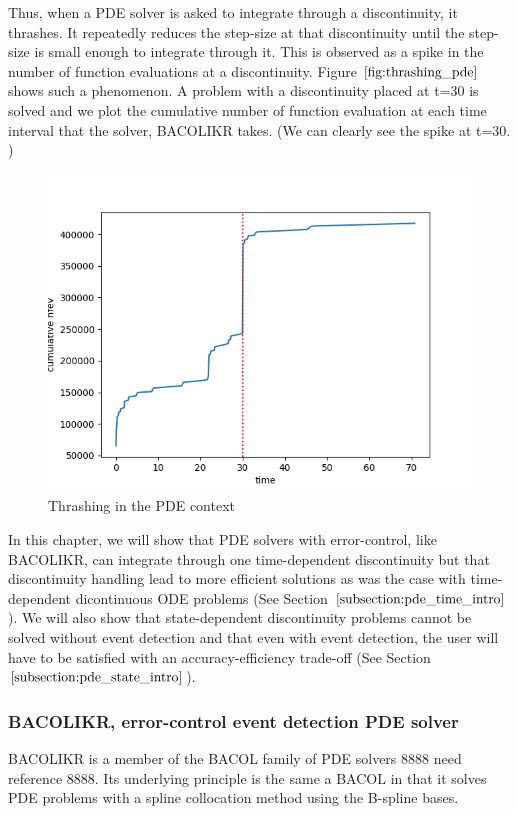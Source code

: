 \documentclass{article}
\begin{document}
Thus, when a PDE solver is asked to integrate through a discontinuity, it thrashes. It repeatedly reduces the step-size at that discontinuity until the step-size is small enough to integrate through it. This is observed as a spike in the number of function evaluations at a discontinuity. Figure $\ref{fig:thrashing_pde}$ shows such a phenomenon. A problem with a discontinuity placed at t=30 is solved and we plot the cumulative number of function evaluation at each time interval that the solver, BACOLIKR takes. (We can clearly see the spike at t=30. )
 
\begin{figure}[H]
\centering
\includegraphics[width=0.7\linewidth]{./figures/pde_thrashing}
\caption{Thrashing in the PDE context}
\label{fig:thrashing_pde}
\end{figure}

In this chapter, we will show that PDE solvers with error-control, like BACOLIKR,  can integrate through one time-dependent discontinuity but that discontinuity handling lead to more efficient solutions as was the case with time-dependent dicontinuous ODE problems (See Section $\ref{subsection:pde_time_intro}$). We will also show that state-dependent discontinuity problems cannot be solved without event detection and that even with event detection, the user will have to be satisfied with an accuracy-efficiency trade-off (See Section $\ref{subsection:pde_state_intro}$).

\subsubsection{BACOLIKR, error-control event detection PDE solver}
\label{subsection:pde_software}
BACOLIKR is a member of the BACOL family of PDE solvers 8888 need reference 8888. Its underlying principle is the same a BACOL in that it solves PDE problems with a spline collocation method using the B-spline bases. 
\end{document}
